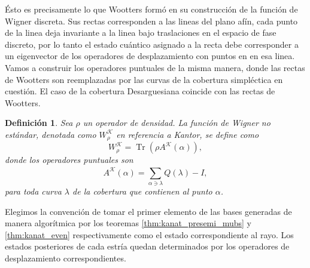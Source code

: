 \documentclass[a4paper,11pt]{report}
\DeclareMathOperator{\Tr}{Tr}
\newtheorem{definition}{Definición}
\begin{document}
  Ésto es precisamente lo que Wootters formó en su
  construcción de la función de Wigner discreta. Sus rectas
  corresponden a las lineas del plano afín, cada punto de la
  linea deja invariante a la linea bajo traslaciones en el
  espacio de fase discreto, por lo tanto el estado cuántico
  asignado a la recta debe corresponder a un eigenvector de
  los operadores de desplazamiento con puntos en en esa
  linea. Vamos a construir los operadores puntuales de la
  misma manera, donde las rectas de Wootters son
  reemplazadas por las curvas de la cobertura simpléctica en
  cuestión. El caso de la cobertura Desarguesiana coincide
  con las rectas de Wootters.
  \begin{definition}
    Sea $\rho$ un operador de densidad. La función de Wigner
    no estándar, denotada como $W_\rho^{\mathcal K}$ en
    referencia a Kantor, se define como
    \begin{equation}
      W_\rho^{\mathcal K}
      = \Tr\left( \rho A^{\mathcal K}(\alpha) \right),
    \end{equation}
    donde los operadores puntuales son
    \begin{equation}
      A^{\mathcal K}(\alpha)
      = \sum_{\alpha \ni \lambda}^{} Q(\lambda) - I,
    \end{equation}
    para toda curva $\lambda$ de la cobertura que contienen
    al punto $\alpha$.
  \end{definition}
  Elegimos la convención de tomar el primer elemento de las
  bases generadas de manera algorítmica por los teoremas
  \ref{thm:kanat_presemi_mubs} y \ref{thm:kanat_even}
  respectivamente como el estado correspondiente al rayo.
  Los estados posteriores de cada estría quedan determinados
  por los operadores de desplazamiento correspondientes.
\end{document}
